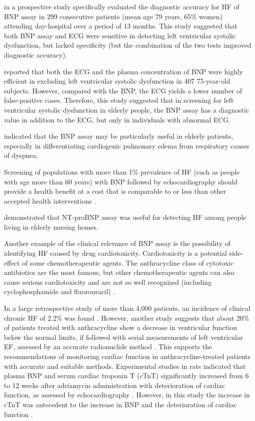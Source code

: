 \documentclass[14pt,a4paper,onecolumn]{extarticle}
\begin{document}
\citep{bib3143} in a prospective study specifically evaluated the diagnostic accuracy for HF of BNP assay in 299 consecutive patients (mean age 79 years, 65\% women) attending day-hospital over a period of 13 months. This study suggested that both BNP assay and ECG were sensitive in detecting left ventricular systolic dysfunction, but lacked specificity (but the combination of the two tests improved diagnostic accuracy).

\citep{bib3172} reported that both the ECG and the plasma concentration of BNP were highly efficient in excluding left ventricular systolic dysfunction in 407 75-year-old subjects. However, compared with the BNP, the ECG yields a lower number of false-positive cases. Therefore, this study suggested that in screening for left ventricular systolic dysfunction in elderly people, the BNP assay has a diagnostic value in addition to the ECG, but only in individuals with abnormal ECG.

\citep{bib3146} indicated that the BNP assay may be particularly useful in elderly patients, especially in differentiating cardiogenic pulmonary edema from respiratory causes of dyspnea.

Screening of populations with more than 1\% prevalence of HF (such as people with age more than 60 years) with BNP followed by echocardiography should provide a health benefit at a cost that is comparable to or less than other accepted health interventions \citep{bib3145}.

\citep{bib3147} demonstrated that NT-proBNP assay was useful for detecting HF among people living in elderly nursing homes.

Another example of the clinical relevance of BNP assay is the possibility of identifying HF caused by drug cardiotoxicity. Cardiotoxicity is a potential side-effect of some chemotherapeutic agents. The anthracycline class of cytotoxic antibiotics are the most famous, but other chemotherapeutic agents can also cause serious cardiotoxicity and are not so well recognized (including cyclophosphamide and fluorouracil) \citep{bib3154}.

In a large retrospective study of more than 4,000 patients, an incidence of clinical chronic HF of 2.2\% was found \citep{bib3155}. However, another  study suggests that about 20\% of patients treated with anthracycline show a decrease in ventricular function below the normal limits, if followed with serial measurements of left ventricular EF, assessed by an accurate radionuclide method \citep{bib3156}. This supports the recommendations of monitoring cardiac function in anthracycline-treated patients with accurate and suitable methods. Experimental studies in rats indicated that plasma BNP and serum cardiac troponin T (cTnT) significantly increased from 6 to 12 weeks after adriamycin administration with deterioration of cardiac function, as assessed by echocardiography \citep{bib3157}. However, in this study the increase in cTnT was antecedent to the increase in BNP and the deterioration of cardiac function \citep{bib3157}.
\end{document}
